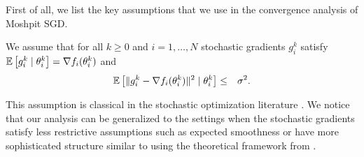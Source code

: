 First of all, we list the key assumptions that we use in the convergence analysis of Moshpit SGD.
\begin{assumption}\label{as:bounded_var}
    We assume that for all $k\ge 0$ and $i=1,\ldots, N$ stochastic gradients $g_i^k$ satisfy $\mathbb{E}\left[g_i^k\mid \theta_i^k\right] = \nabla f_i(\theta_i^k)$ and
    \begin{eqnarray}
        \mathbb{E}\left[\|g_i^k - \nabla f_i(\theta_i^k)\|^2\mid \theta_i^k\right] &\le& \sigma^2.\label{eq:bounded_variance}
    \end{eqnarray}
\end{assumption}\vspace{-6px}
This assumption is classical in the stochastic optimization literature \cite{nemirovski2009robust,ghadimi2013stochastic}. We notice that our analysis can be generalized to the settings when the stochastic gradients satisfy less restrictive assumptions such as expected smoothness \cite{gower2019sgd} or have more sophisticated structure similar to \cite{karimireddy2020scaffold} using the theoretical framework from \cite{gorbunov2020local}.


